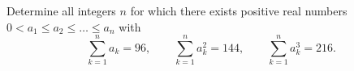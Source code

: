 Determine all integers $n$ for which there exists positive real numbers
$0<a_1 \leq a_2 \leq \ldots \leq a_n$ with
$$\sum_{k=1}^n a_k=96,\qquad \sum_{k=1}^n a_k^2=144,\qquad \sum_{k=1}^n a_k^3=216.$$